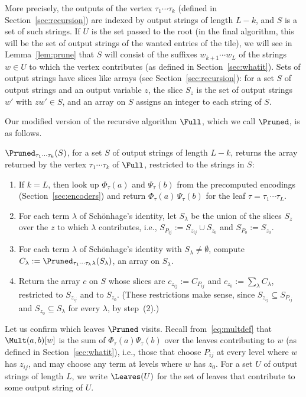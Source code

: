 More precisely, the outputs of the vertex $\tau_1\cdots\tau_k$ (defined in Section~\ref{sec:recursion}) are indexed by output strings of length $L-k$, and $S$ is a set of such strings. If $U$ is the set passed to the root (in the final algorithm, this will be the set of output strings of the wanted entries of the tile), we will see in Lemma~\ref{lem:prune} that $S$ will consist of the suffixes $w_{k+1}\cdots w_L$ of the strings $w\in U$ to which the vertex contributes (as defined in Section~\ref{sec:whatit}). 
Sets of output strings have slices like arrays (see Section~\ref{sec:recursion}): for a set $S$ of output strings and an output variable $z$, the slice $S_z$ is the set of output strings $w'$ with $zw'\in S$, and an array on $S$ assigns an integer to each string of $S$.

Our modified version of the recursive algorithm $\Full$, which we call $\Pruned$, is as follows.

\medskip
\noindent\begin{minipage}[t]{\linewidth}
$\Pruned_{\tau_1\cdots\tau_k}(S)$, for a set $S$ of output strings of length $L-k$, returns the array returned by the vertex $\tau_1\cdots\tau_k$ of $\Full$, restricted to the strings in $S$:
\begin{enumerate}[label=(\arabic*),nosep]
\item If $k=L$, then look up $\Phi_\tau(a)$ and $\Psi_\tau(b)$ from the precomputed encodings (Section~\ref{sec:encoders}) and return $\Phi_\tau(a)\,\Psi_\tau(b)$ for the leaf $\tau=\tau_1\cdots\tau_L$.
\item For each term $\lambda$ of Sch\"onhage's identity, let $S_\lambda$ be the union of the slices $S_z$ over the $z$ to which $\lambda$ contributes, i.e., $S_{P_{ij}}:=S_{z_{ij}}\cup S_{z_0}$ and $S_{P_0}:=S_{z_0}$.
\item For each term $\lambda$ of Sch\"onhage's identity with $S_\lambda\ne\emptyset$, compute $C_\lambda:=\Pruned_{\tau_1\cdots\tau_k\lambda}(S_\lambda)$, an array on $S_\lambda$.
\item Return the array $c$ on $S$ whose slices are $c_{z_{ij}}:=C_{P_{ij}}$ and $c_{z_0}:=\sum_\lambda C_\lambda$, restricted to $S_{z_{ij}}$ and to $S_{z_0}$. (These restrictions make sense, since $S_{z_{ij}}\subseteq S_{P_{ij}}$ and $S_{z_0}\subseteq S_\lambda$ for every $\lambda$, by step~(2).)
\end{enumerate}
\end{minipage}
\medskip

Let us confirm which leaves $\Pruned$ visits. Recall from~\eqref{eq:multdef} that $\Mult(a,b)[w]$ is the sum of $\Phi_\tau(a)\Psi_\tau(b)$ over the leaves contributing to $w$ (as defined in Section~\ref{sec:whatit}), i.e., those that choose $P_{ij}$ at every level where $w$ has $z_{ij}$, and may choose any term at levels where $w$ has $z_0$. For a set $U$ of output strings of length $L$, we write $\Leaves(U)$ for the set of leaves that contribute to some output string of $U$.

